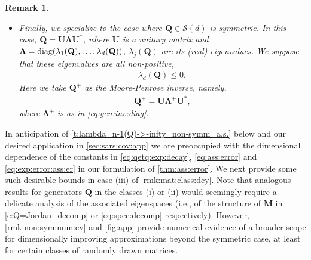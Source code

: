 \documentclass[9pt,twocolumn,twoside]{pnas-new}
\makeatletter
\newcommand{\?}{\textbf{?}}
\newcommand{\diag}{\textnormal{diag}}
\newcommand{\QQ}{\mathbf{Q}}
\newcommand{\LLambda}{\boldsymbol{\Lambda}}
\newcommand{\M}{\mathbf{M}}
\newcommand{\UU}{\mathbf{U}}
\newtheorem{@remark}{\bf Remark}
\newenvironment{remark}{\begin{@remark}\rm}{\end{@remark}}
\makeatother
\begin{document}
\begin{remark}
\begin{itemize}
\begin{align}
      \end{align}
    The complex numbers $\lambda_j(\QQ)^+$,
    $j = 1, \ldots, d$ are defined as in \eqref{eq:eig:gen:inv}.
  \item[(iii)] Finally, we specialize to the case where
    $\QQ \in \mathcal{S}(d)$ is symmetric. In this case,
    $\QQ = \UU \LLambda \UU^*$, where $\UU$ is a unitary matrix and
    $\LLambda = \diag (\lambda_1(\QQ), \ldots ,\lambda_d(\QQ))$,
    $\lambda_j(\QQ)$ are its (real) eigenvalues.  We suppose that
    these eigenvalues are all non-positive,
    \begin{align}\label{eq:ev:d:cond:sym:case}
      \lambda_d({\mathbf Q}) \leq 0,
    \end{align}
    Here we take $\QQ^+$ as the Moore-Penrose inverse, namely,
    \begin{align}\label{eq:MP:inv:sym:case}
      \QQ^+ = \UU \LLambda^+ \UU^*,
   \end{align}
    where $\LLambda^+$ is as in \eqref{eq:gen:inv:diag}.   
  \end{itemize}
\end{remark}
In anticipation of \cref{t:lambda_n-1(Q)->-infty_non-symm_a.s.} below
and our desired application in \cref{sec:sars:cov:app} we are
preoccupied with the dimensional dependence of the constants in
\eqref{eq:qetq:exp:decay}, \eqref{eq:ass:error}
and \eqref{eq:exp:error:ass:er} in our formulation of
\cref{thm:ass:error}.  We next provide some such desirable bounds in
case (iii) of \cref{rmk:mat:class:dcy}.  Note that analogous results
for generators $\QQ$ in the classes (i) or (ii) would seemingly
require a delicate analysis of the associated eigenspaces (i.e., of the
structure of $\M$ in \eqref{e:Q=Jordan_decomp} or
\eqref{eq:spec:decomp} respectively).  However,
\cref{rmk:non:sym:num:ev} and \cref{fig:app} provide numerical evidence
of a broader scope for dimensionally improving approximations beyond
the symmetric case, at least for certain classes of randomly drawn
matrices.
\end{document}
